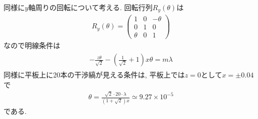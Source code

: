 同様に$y$軸周りの回転について考える.
回転行列$R_y(\theta)$は
\begin{align}
  R_y(\theta)=\left(\begin{array}{ccc}
    1&0&-\theta\\
    0&1&0\\
    \theta&0&1
  \end{array}\right)
\end{align}
なので明線条件は
\begin{align}
  \begin{split}
    -\frac{z\theta}{\sqrt{2}}-\left(\frac{1}{\sqrt{2}}+1\right)x\theta=m\lambda
  \end{split}
\end{align}
同様に平板上に20本の干渉縞が見える条件は,
平板上では$z=0$として$x=\pm0.04$で
\begin{align}
  \label{equ:132_yrot}
  \theta=\frac{\sqrt{2}\cdot20\cdot\lambda}{(1+\sqrt{2})x}\simeq9.27\times10^{-5}
\end{align}
である.
